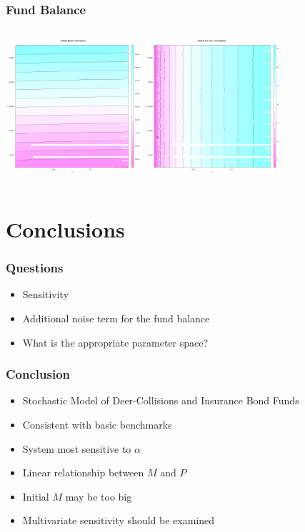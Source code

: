 \documentclass{beamer}   %
\begin{document}
\begin{frame}
  \frametitle{Fund Balance}
  \hspace*{-5mm}
  \begin{columns}
    \includegraphics[height=5cm]{fundMeanContour}
    \includegraphics[height=5cm]{fundSDContour}
  \end{columns}
\end{frame}




\section{Conclusions}

\begin{frame}
  \frametitle{Questions}

  \begin{itemize}
  \item Sensitivity
  \item Additional noise term for the fund balance
  \item What is the appropriate parameter space?
  \end{itemize}
  
\end{frame}

\begin{frame}
  \frametitle{Conclusion}
  \begin{itemize}
  \item Stochastic Model of Deer-Collisions and Insurance Bond Funds 
  \item Consistent with basic benchmarks
  \item System most sensitive to $\alpha$
  \item Linear relationship between $M$ and $P$
  \item Initial $M$ may be too big
  \item Multivariate sensitivity should be examined
  \end{itemize}

\end{frame}
\end{document}
